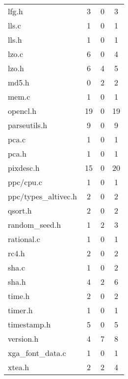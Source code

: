 \begin{longtable}{l || c | c | c}
  lfg.h                 & 3         & 0        & 3          \\
  lls.c                 & 1         & 0        & 1          \\
  lls.h                 & 1         & 0        & 1          \\
  lzo.c                 & 6         & 0        & 4          \\
  lzo.h                 & 6         & 4        & 5          \\
  md5.h                 & 0         & 2        & 2          \\
  mem.c                 & 1         & 0        & 1          \\
  opencl.h              & 19        & 0        & 19          \\
  parseutils.h          & 9         & 0        & 9          \\
  pca.c                 & 1         & 0        & 1          \\
  pca.h                 & 1         & 0        & 1          \\
  pixdesc.h             & 15        & 0        & 20          \\
  ppc/cpu.c             & 1         & 0        & 1          \\
  ppc/types\_altivec.h  & 2         & 0        & 2          \\
  qsort.h               & 2         & 0        & 2          \\
  random\_seed.h        & 1         & 2        & 3          \\
  rational.c            & 1         & 0        & 1          \\
  rc4.h                 & 2         & 0        & 2          \\
  sha.c                 & 1         & 0        & 2          \\
  sha.h                 & 4         & 2        & 6          \\
  time.h                & 2         & 0        & 2          \\
  timer.h               & 1         & 0        & 1          \\
  timestamp.h           & 5         & 0        & 5          \\
  version.h             & 4         & 7        & 8          \\
  xga\_font\_data.c     & 1         & 0        & 1          \\
  xtea.h                & 2         & 2        & 4          \\
\end{longtable}


